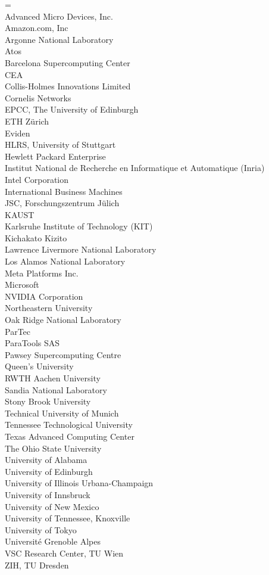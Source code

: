 \begin{obeylines}\leftskip=\parindent\parindent=0pt %
Advanced Micro Devices, Inc.
Amazon.com, Inc
Argonne National Laboratory
Atos
Barcelona Supercomputing Center
CEA
Collis-Holmes Innovations Limited
Cornelis Networks
EPCC, The University of Edinburgh
ETH Z\"urich
Eviden
HLRS, University of Stuttgart
Hewlett Packard Enterprise
Institut National de Recherche en Informatique et Automatique (Inria)
Intel Corporation
International Business Machines
JSC, Forschungszentrum J\"ulich
KAUST
Karlsruhe Institute of Technology (KIT)
Kichakato Kizito
Lawrence Livermore National Laboratory
Los Alamos National Laboratory
Meta Platforms Inc.
Microsoft
NVIDIA Corporation
Northeastern University
Oak Ridge National Laboratory
ParTec
ParaTools SAS
Pawsey Supercomputing Centre
Queen's University
RWTH Aachen University
Sandia National Laboratory
Stony Brook University
Technical University of Munich
Tennessee Technological University
Texas Advanced Computing Center
The Ohio State University
University of Alabama
University of Edinburgh
University of Illinois Urbana-Champaign
University of Innsbruck
University of New Mexico
University of Tennessee, Knoxville
University of Tokyo
Université Grenoble Alpes
VSC Research Center, TU Wien
ZIH, TU Dresden
\end{obeylines}
